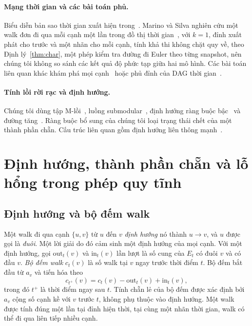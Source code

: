 \documentclass[pdflatex,sn-mathphys-num]{sn-jnl}
\theoremstyle{thmstyleone}
\theoremstyle{thmstyletwo}
\theoremstyle{thmstylethree}
\newcommand{\out}{\mathrm{out}}
\newcommand{\inn}{\mathrm{in}}
\begin{document}
\paragraph{Mạng thời gian và các bài toán phủ.}
Biểu diễn bản sao thời gian xuất hiện trong~\cite{akrida2019}. Marino và Silva nghiên cứu một walk đơn đi qua mỗi cạnh một lần trong đồ thị thời gian~\cite{marino2023}, với $k=1$, đỉnh xuất phát cho trước và một nhãn cho mỗi cạnh, tính khả thi không chặt quy về, theo Định lý~\ref{thm:char}, một phép kiểm tra đường đi Euler theo từng snapshot, nên chúng tôi không so sánh các kết quả độ phức tạp giữa hai mô hình. Các bài toán liên quan khác khám phá mọi cạnh~\cite{bumpus2023} hoặc phủ đỉnh của DAG thời gian~\cite{chakraborty2024}.

\paragraph{Tính lồi rời rạc và định hướng.}
Chúng tôi dùng tập M-lồi~\cite{murota1996,murota2003}, luồng submodular~\cite{edmonds1977,franktardos1988,murota2003,fujishige2005}, định hướng ràng buộc bậc~\cite{hakimi1965,frank1980,frank2011} và đường tăng~\cite{cunningham1985,fujishige2005}. Ràng buộc bổ sung của chúng tôi loại trạng thái chết của một thành phần chẵn. Cấu trúc liên quan gồm định hướng liên thông mạnh~\cite{abdi2025}.

\section{Định hướng, thành phần chẵn và lỗ hổng trong phép quy tĩnh}\label{sec:char}

\subsection{Định hướng và bộ đếm walk}

Một walk đi qua cạnh $\{u,v\}$ từ $u$ đến $v$ \emph{định hướng} nó thành $u\to v$, và $u$ được gọi là \emph{đuôi}. Một lời giải do đó cảm sinh một định hướng của mọi cạnh. Với một định hướng, gọi $\out_t(v)$ và $\inn_t(v)$ lần lượt là số cung của $E_t$ có đuôi $v$ và có đầu $v$. \emph{Bộ đếm walk} $c_t(v)$ là số walk tại $v$ ngay trước thời điểm $t$. Bộ đếm bắt đầu từ $a_v$ và tiến hóa theo
\[
  c_{t^+}(v)=c_t(v)-\out_t(v)+\inn_t(v),
\]
trong đó $t^+$ là thời điểm ngay sau $t$. Tính chẵn lẻ của bộ đếm được xác định bởi $a_v$ cộng số cạnh kề với $v$ trước $t$, không phụ thuộc vào định hướng. Một walk được tính đúng một lần tại đỉnh hiện thời, tại cùng một nhãn thời gian, walk có thể đi qua liên tiếp nhiều cạnh.
\end{document}
